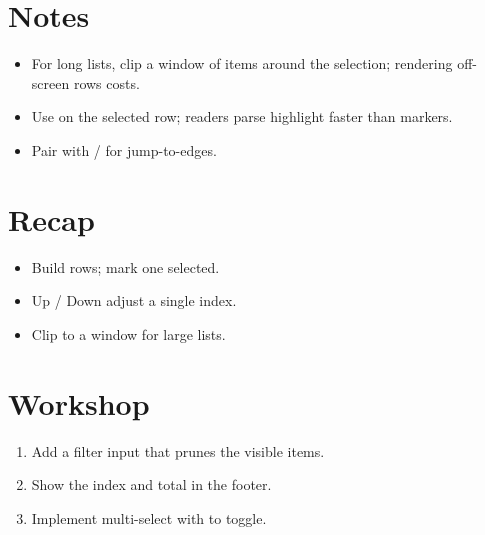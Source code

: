 \section{Notes}

\begin{itemize}[leftmargin=*]
  \item For long lists, clip a window of items around the
    selection; rendering off-screen rows costs.
  \item Use  on the selected row; readers
    parse highlight faster than markers.
  \item Pair with / for jump-to-edges.
\end{itemize}

\section{Recap}

\begin{recap}
\begin{itemize}[leftmargin=*]
  \item Build rows; mark one selected.
  \item Up / Down adjust a single index.
  \item Clip to a window for large lists.
\end{itemize}
\end{recap}

\section*{Workshop}

\begin{enumerate}[leftmargin=*]
  \item Add a filter input that prunes the visible items.
  \item Show the index and total in the footer.
  \item Implement multi-select with  to toggle.
\end{enumerate}
